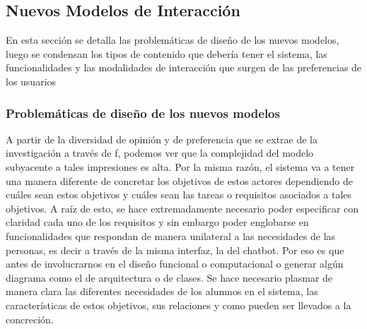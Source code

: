 \subsection{Nuevos Modelos de Interacción}
    \par En esta sección se detalla las problemáticas de diseño de los nuevos modelos, luego se condensan los tipos de contenido que debería tener el sistema, las funcionalidades y las modalidades de interacción que surgen de las preferencias de los usuarios

    \subsubsection{Problemáticas de diseño de los nuevos modelos}
    \par A partir de la diversidad de opinión y de preferencia que se extrae de la investigación a través de \acrlong{f}, podemos ver que la complejidad del modelo subyacente a tales impresiones es alta. Por la misma razón, el sistema va a tener una manera diferente de concretar los objetivos de estos actores dependiendo de cuáles sean estos objetivos y cuáles sean las tareas o requisitos asociados a tales objetivos. A raíz de esto, se hace extremadamente necesario poder especificar con claridad cada uno de los requisitos y sin embargo poder englobarse en funcionalidades que respondan de manera unilateral a las necesidades de las personas, es decir a través de la misma interfaz, la del chatbot. Por eso es que antes de involucrarnos en el diseño funcional o computacional o generar algún diagrama como el de arquitectura o de clases. Se hace necesario plasmar de manera clara las diferentes necesidades de los alumnos en el sistema, las características de estos objetivos, sus relaciones y como pueden ser llevados a la concreción.
    
